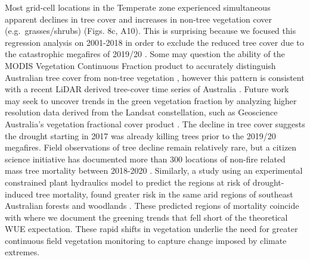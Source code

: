 \documentclass[gc, manuscript]{copernicus}
\begin{document}
Most grid-cell locations in the Temperate zone experienced simultaneous
apparent declines in tree cover and increases in non-tree vegetation
cover (e.g.~grasses/shrubs) (Figs. 8c, A10). This is surprising because
we focused this regression analysis on 2001-2018 in order to exclude the
reduced tree cover due to the catastrophic megafires of 2019/20
\citep{nolanCausesConsequencesEastern2020}. Some may question the
ability of the MODIS Vegetation Continuous Fraction product
\citep{dimiceliMOD44BMODISTerra2017} to accurately distinguish
Australian tree cover from non-tree vegetation
\citep{sexton_etal13, adzhar_etal21}, however this pattern is consistent
with a recent LiDAR derived tree-cover time series of Australia
\citep{liaoWoodyVegetationCover2020}. Future work may seek to uncover
trends in the green vegetation fraction by analyzing higher resolution
data derived from the Landsat constellation, such as Geoscience
Australia's vegetation fractional cover product \citep{gill_etal17}. The
decline in tree cover suggests the drought starting in 2017 was already
killing trees prior to the 2019/20 megafires. Field observations of tree
decline remain relatively rare, but a citizen science initiative has
documented more than 300 locations of non-fire related mass tree
mortality between 2018-2020
\citep{atlasoflivingaustraliaDeadTreeDetective}. Similarly, a study
using an experimental constrained plant hydraulics model to predict the
regions at risk of drought-induced tree mortality, found greater risk in
the same arid regions of southeast Australian forests and woodlands
\citep{dekauweIdentifyingAreasRisk2020b}. These predicted regions of
mortality coincide with where we document the greening trends that fell
short of the theoretical WUE expectation. These rapid shifts in
vegetation underlie the need for greater continuous field vegetation
monitoring to capture change imposed by climate extremes.
\end{document}
